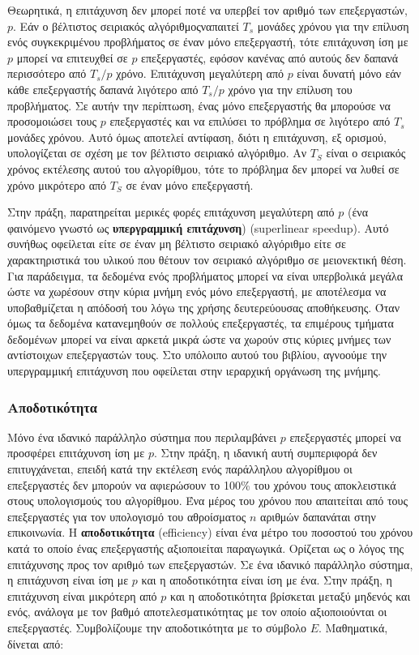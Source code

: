 \documentclass[12pt,a4paper]{article}
\begin{document}
Θεωρητικά, η επιτάχυνση δεν μπορεί ποτέ να υπερβεί τον αριθμό των 
επεξεργαστών, $p$. Εάν ο βέλτιστος σειριακός αλγόριθμοςναπαιτεί $T_s$ 
μονάδες χρόνου για την επίλυση ενός συγκεκριμένου προβλήματος σε έναν 
μόνο επεξεργαστή, τότε επιτάχυνση ίση με $p$ μπορεί να επιτευχθεί σε $p$ 
επεξεργαστές, εφόσον κανένας από αυτούς δεν δαπανά περισσότερο από $T_s/p$ 
χρόνο. Επιτάχυνση μεγαλύτερη από $p$ είναι δυνατή μόνο εάν κάθε 
επεξεργαστής δαπανά λιγότερο από $T_s/p$ χρόνο για την επίλυση του 
προβλήματος. Σε αυτήν την περίπτωση, ένας μόνο επεξεργαστής θα μπορούσε 
να προσομοιώσει τους $p$ επεξεργαστές και να επιλύσει το πρόβλημα σε 
λιγότερο από $T_s$ μονάδες χρόνου. Αυτό όμως αποτελεί αντίφαση, διότι η
επιτάχυνση, εξ ορισμού, υπολογίζεται σε σχέση με τον βέλτιστο σειριακό 
αλγόριθμο. Αν $T_S$ είναι ο σειριακός χρόνος εκτέλεσης αυτού του αλγορίθμου, 
τότε το πρόβλημα δεν μπορεί να λυθεί σε χρόνο μικρότερο από $T_S$ σε έναν 
μόνο επεξεργαστή.

Στην πράξη, παρατηρείται μερικές φορές επιτάχυνση μεγαλύτερη από $p$ (ένα 
φαινόμενο γνωστό ως \textbf{υπεργραμμική επιτάχυνση}) 
({\foreignlanguage{english}{superlinear speedup}}). Αυτό συνήθως οφείλεται 
είτε σε έναν μη βέλτιστο σειριακό αλγόριθμο είτε σε χαρακτηριστικά του 
υλικού που θέτουν τον σειριακό αλγόριθμο σε μειονεκτική θέση. Για 
παράδειγμα, τα δεδομένα ενός προβλήματος μπορεί να είναι υπερβολικά 
μεγάλα ώστε να χωρέσουν στην κύρια μνήμη ενός μόνο επεξεργαστή, με 
αποτέλεσμα να υποβαθμίζεται η απόδοσή του λόγω της χρήσης δευτερεύουσας 
αποθήκευσης. Όταν όμως τα δεδομένα κατανεμηθούν σε πολλούς επεξεργαστές, 
τα επιμέρους τμήματα δεδομένων μπορεί να είναι αρκετά μικρά ώστε να χωρούν 
στις κύριες μνήμες των αντίστοιχων επεξεργαστών τους. Στο υπόλοιπο αυτού 
του βιβλίου, αγνοούμε την υπεργραμμική επιτάχυνση που οφείλεται στην 
ιεραρχική οργάνωση της μνήμης.

\subsubsection{Αποδοτικότητα}
Μόνο ένα ιδανικό παράλληλο σύστημα που περιλαμβάνει $p$ επεξεργαστές 
μπορεί να προσφέρει επιτάχυνση ίση με $p$. Στην πράξη, η ιδανική αυτή 
συμπεριφορά δεν επιτυγχάνεται, επειδή κατά την εκτέλεση ενός παράλληλου 
αλγορίθμου οι επεξεργαστές δεν μπορούν να αφιερώσουν το 100\% του χρόνου 
τους αποκλειστικά στους υπολογισμούς του αλγορίθμου. Ένα μέρος του χρόνου 
που απαιτείται από τους επεξεργαστές για τον υπολογισμό του αθροίσματος $n$ 
αριθμών δαπανάται στην επικοινωνία. Η \textbf{αποδοτικότητα} 
({\foreignlanguage{english}{efficiency}}) είναι ένα μέτρο του ποσοστού του 
χρόνου κατά το οποίο ένας επεξεργαστής αξιοποιείται παραγωγικά. Ορίζεται 
ως ο λόγος της επιτάχυνσης προς τον αριθμό των επεξεργαστών. Σε ένα ιδανικό 
παράλληλο σύστημα, η επιτάχυνση είναι ίση με $p$ και η αποδοτικότητα είναι 
ίση με ένα. Στην πράξη, η επιτάχυνση είναι μικρότερη από $p$ και η 
αποδοτικότητα βρίσκεται μεταξύ μηδενός και ενός, ανάλογα με τον βαθμό 
αποτελεσματικότητας με τον οποίο αξιοποιούνται οι επεξεργαστές. 
Συμβολίζουμε την αποδοτικότητα με το σύμβολο $E$. Μαθηματικά, δίνεται από:
\end{document}
